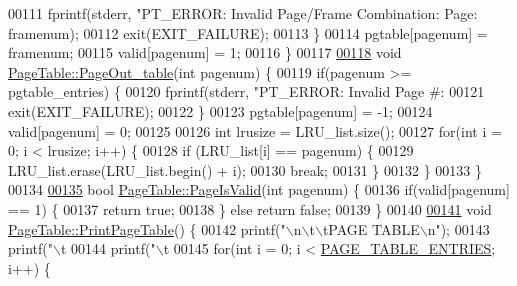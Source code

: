 \begin{DoxyCode}
{{{{{{00111         fprintf(stderr, \textcolor{stringliteral}{"PT\_ERROR: Invalid Page/Frame Combination: Page: %
      framenum);
00112         exit(EXIT\_FAILURE);
00113     \}
00114     pgtable[pagenum] = framenum;
00115     valid[pagenum] = 1;
00116 \}
00117 
\hypertarget{memory_8cpp_source.tex_l00118}{}\hyperlink{classPageTable_ae8c5d4a967b4d8d45e8d4e517f618f70}{00118} \textcolor{keywordtype}{void} \hyperlink{classPageTable_ae8c5d4a967b4d8d45e8d4e517f618f70}{PageTable::PageOut\_table}(\textcolor{keywordtype}{int} pagenum) \{
00119     \textcolor{keywordflow}{if}(pagenum >= pgtable\_entries) \{
00120         fprintf(stderr, \textcolor{stringliteral}{"PT\_ERROR: Invalid Page #: %
00121         exit(EXIT\_FAILURE);
00122     \}
00123     pgtable[pagenum] = -1;
00124     valid[pagenum] = 0;
00125 
00126     \textcolor{keywordtype}{int} lrusize = LRU\_list.size();
00127     \textcolor{keywordflow}{for}(\textcolor{keywordtype}{int} i = 0; i < lrusize; i++) \{
00128         \textcolor{keywordflow}{if} (LRU\_list[i] == pagenum) \{
00129             LRU\_list.erase(LRU\_list.begin() + i);
00130             \textcolor{keywordflow}{break};
00131         \}
00132     \} 
00133 \}
00134 
\hypertarget{memory_8cpp_source.tex_l00135}{}\hyperlink{classPageTable_ac43e4430873d7760eb7a25cd9a025f8c}{00135} \textcolor{keywordtype}{bool} \hyperlink{classPageTable_ac43e4430873d7760eb7a25cd9a025f8c}{PageTable::PageIsValid}(\textcolor{keywordtype}{int} pagenum) \{
00136     \textcolor{keywordflow}{if}(valid[pagenum] == 1) \{
00137         \textcolor{keywordflow}{return} \textcolor{keyword}{true};
00138     \} \textcolor{keywordflow}{else} \textcolor{keywordflow}{return} \textcolor{keyword}{false};
00139 \}
00140 
\hypertarget{memory_8cpp_source.tex_l00141}{}\hyperlink{classPageTable_ab06580f0815ea97a303a09da860a670b}{00141} \textcolor{keywordtype}{void} \hyperlink{classPageTable_ab06580f0815ea97a303a09da860a670b}{PageTable::PrintPageTable}() \{
00142     printf(\textcolor{stringliteral}{"\(\backslash\)n\(\backslash\)t\(\backslash\)tPAGE TABLE\(\backslash\)n"});
00143     printf(\textcolor{stringliteral}{"\(\backslash\)t%
00144     printf(\textcolor{stringliteral}{"\(\backslash\)t%
00145     \textcolor{keywordflow}{for}(\textcolor{keywordtype}{int} i = 0; i < \hyperlink{memory_8h_a6fc2e8cefe03a42d0a238bad856a2a8b}{PAGE\_TABLE\_ENTRIES}; i++) \{
}}}}}}}}}}
\end{DoxyCode}
